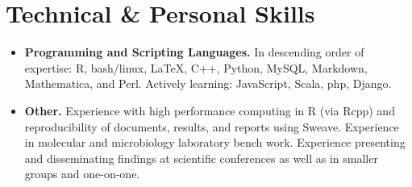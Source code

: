 \documentclass[11pt,letterpaper,sans]{moderncv}        %
\begin{document}
\section{Technical \& Personal Skills}

\vspace{4pt}

\begin{itemize}

\item \textbf{Programming and Scripting Languages.} In descending order of expertise: R, bash/linux, \LaTeX, C++, Python, MySQL, Markdown, Mathematica, and Perl. Actively learning: JavaScript, Scala, php, Django.



\vspace{4pt}

\item \textbf{Other.} Experience with high performance computing in R (via Rcpp) and reproducibility of documents, results, and reports using Sweave.  Experience in molecular and microbiology laboratory bench work. Experience presenting and disseminating findings at scientific conferences as well as in smaller groups and one-on-one.

\end{itemize}
\vspace{4pt}
%
%
\end{document}
